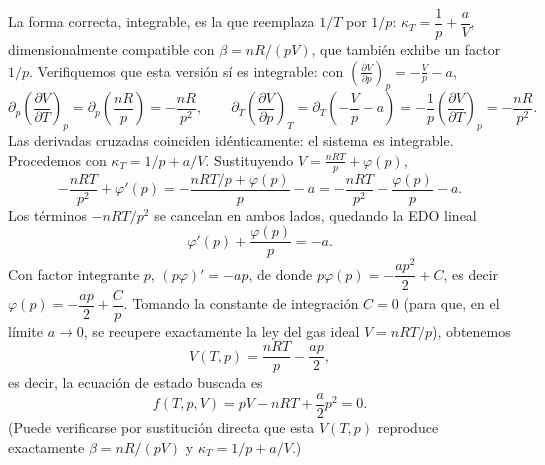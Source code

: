 \documentclass[12pt,a4paper]{article}
\newcommand{\paren}[1]{\left( #1 \right)}
\newcommand{\pd}[3]{\left(\frac{\partial #1}{\partial #2}\right)_{#3}}
\begin{document}
\begin{solucion}
        La forma correcta, integrable, es la que reemplaza $1/T$ por $1/p$:
        $\kappa_{T}=\dfrac1p+\dfrac aV$, dimensionalmente compatible con $\beta=nR/(pV)$, que
        también exhibe un factor $1/p$. Verifiquemos que esta versión sí es integrable: con
        $\pd Vpp=-\frac{V}{p}-a$,
        \begin{equation*}
            \partial_{p}\pd{V}{T}{p}=\partial_{p}\paren{\frac{nR}{p}}=-\frac{nR}{p^{2}},
            \qquad
            \partial_{T}\pd{V}{p}{T}=\partial_{T}\paren{-\frac Vp-a}=-\frac1p\pd{V}{T}{p}=-\frac{nR}{p^{2}}.
        \end{equation*}
        Las derivadas cruzadas coinciden idénticamente: el sistema es integrable. Procedemos con
        $\kappa_{T}=1/p+a/V$. Sustituyendo $V=\frac{nRT}{p}+\varphi(p)$,
        \begin{equation*}
            -\frac{nRT}{p^{2}}+\varphi'(p)=-\frac{nRT/p+\varphi(p)}{p}-a
            =-\frac{nRT}{p^{2}}-\frac{\varphi(p)}{p}-a.
        \end{equation*}
        Los términos $-nRT/p^{2}$ se cancelan en ambos lados, quedando la EDO lineal
        \begin{equation*}
            \varphi'(p)+\frac{\varphi(p)}{p}=-a.
        \end{equation*}
        Con factor integrante $p$, $(p\varphi)'=-ap$, de donde $p\varphi(p)=-\dfrac{ap^{2}}{2}+C$,
        es decir $\varphi(p)=-\dfrac{ap}{2}+\dfrac{C}{p}$. Tomando la constante de integración
        $C=0$ (para que, en el límite $a\to0$, se recupere exactamente la ley del gas ideal
        $V=nRT/p$), obtenemos
        \begin{equation*}
            V(T,p)=\frac{nRT}{p}-\frac{ap}{2},
        \end{equation*}
        es decir, la ecuación de estado buscada es
        \begin{equation*}
            \boxed{f(T,p,V)=pV-nRT+\frac{a}{2}p^{2}=0.}
        \end{equation*}
        (Puede verificarse por sustitución directa que esta $V(T,p)$ reproduce exactamente
        $\beta=nR/(pV)$ y $\kappa_{T}=1/p+a/V$.)
    \end{solucion}
\end{document}

